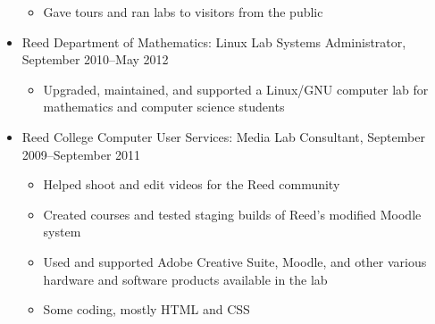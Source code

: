 \documentclass[letterpaper]{article}
\begin{document}
\begin{itemize}
\begin{itemize}
	\item Gave tours and ran labs to visitors from the public
	\end{itemize}
\item Reed Department of Mathematics: Linux Lab Systems Administrator, September 2010--May 2012
	\begin{itemize}
	\item Upgraded, maintained, and supported a Linux/GNU computer lab for mathematics and computer science students
	\end{itemize}
\item Reed College Computer User Services: Media Lab Consultant, September 2009--September 2011
	\begin{itemize}
	\item Helped shoot and edit videos for the Reed community
	\item Created courses and tested staging builds of Reed's modified Moodle system 
	\item Used and supported Adobe Creative Suite, Moodle, and other various hardware and software products available in the lab
	\item Some coding, mostly HTML and CSS
	\end{itemize}
\end{itemize}





\end{document}
